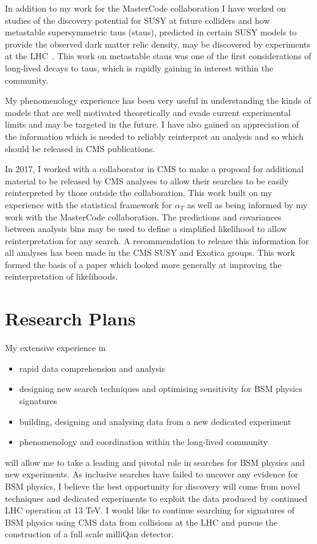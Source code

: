 \documentclass[11pt]{article}
\theoremstyle{plain} \numberwithin{equation}{section}
\theoremstyle{definition}
\begin{document}
In addition to my work for the MasterCode collaboration I have worked on 
studies of the discovery potential for SUSY at future colliders and how 
metastable supersymmetric taus (staus), predicted in certain SUSY models to provide the observed
dark matter relic density, may be discovered by experiments at the LHC~\cite{Citron:2012fg}. 
This work on metastable staus was one of the first considerations of long-lived decays to taus, which
is rapidly gaining in interest within the community.

My phenomenology experience has been very useful in understanding
the kinds of models that are well motivated theoretically and evade current experimental limits and may be targeted in the 
future. I have also gained an appreciation
of the information which is needed to reliably reinterpret an analysis and so which should be released in CMS publications.

In 2017, I worked with a collaborator in CMS to make a proposal 
for additional material to be released by CMS analyses
to allow their searches to be easily reinterpreted by those outside the collaboration. 
This work built on my experience with the statistical framework for $\alpha_T$ as well as being 
informed by my work with the MasterCode collaboration. The predictions and covariances between analysis bins may be used
to define a simplified likelihood to allow reinterpretation for any search. 
A recommendation to release this information for all analyses
has been made in the CMS SUSY and Exotica groups. This work formed the
basis of a paper which looked more generally at improving
the reinterpretation of likelihoods.

\section*{Research Plans}

My extensive experience in

\begin{itemize}
\item rapid data comprehension and analysis
\item designing new search techniques and optimising sensitivity for BSM physics signatures
\item building, designing and analysing data from a new dedicated experiment
\item phenomenology and coordination within the long-lived community
\end{itemize}

\noindent will allow me to take a leading and pivotal role in searches for BSM physics and new experiments.
As inclusive searches have failed to uncover any evidence for BSM physics, 
I believe the best opportunity for discovery will 
come from novel techniques and dedicated experiments to exploit the data produced
by continued LHC operation at 13 TeV.  I would like to continue searching for 
signatures of BSM physics using CMS data from collisions at the LHC
and pursue the construction of a full scale milliQan detector.
\end{document}
